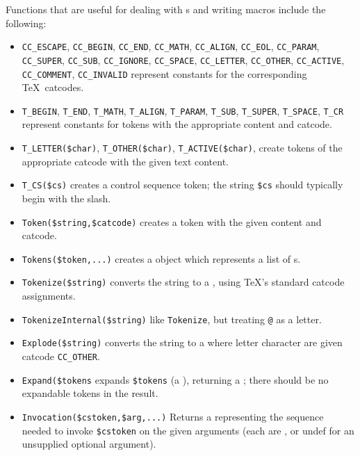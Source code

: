 \documentclass{book}
\begin{document}
Functions that are useful for dealing with s and writing macros
include the following:
\begin{itemize}
\item \raggedright \verb|CC_ESCAPE|, \verb|CC_BEGIN|, \verb|CC_END|, \verb|CC_MATH|,
      \verb|CC_ALIGN|, \verb|CC_EOL|, \verb|CC_PARAM|, \verb|CC_SUPER|,
      \verb|CC_SUB|,   \verb|CC_IGNORE|, \verb|CC_SPACE|, \verb|CC_LETTER|,
      \verb|CC_OTHER|, \verb|CC_ACTIVE|, \verb|CC_COMMENT|, \verb|CC_INVALID|
    represent constants for the corresponding \TeX\ catcodes.
\item  \raggedright \verb|T_BEGIN|, \verb|T_END|, \verb|T_MATH|, \verb|T_ALIGN|,
      \verb|T_PARAM|, \verb|T_SUB|, \verb|T_SUPER|, \verb|T_SPACE|,
      \verb|T_CR|
  represent constants for tokens with the appropriate content and catcode.
\item \verb|T_LETTER($char)|, \verb|T_OTHER($char)|, \verb|T_ACTIVE($char)|,
  create tokens of the appropriate catcode with the given text content.
\item \verb|T_CS($cs)| creates a control sequence token; 
  the string \verb|$cs| should typically begin with the slash.
\item \verb|Token($string,$catcode)| creates a token with the given content and catcode.
\item \verb|Tokens($token,...)| creates a  object which
   represents a list of s.
\item \verb|Tokenize($string)| converts the string to a ,
   using \TeX's standard catcode assignments.
\item \verb|TokenizeInternal($string)| like \texttt{Tokenize}, but
   treating \verb|@| as a letter.
\item \verb|Explode($string)| converts the string to a  where
   letter character are given catcode \verb|CC_OTHER|.
\item \verb|Expand($tokens| expands \verb|$tokens| (a ), returning
  a ; there should be no expandable tokens in the result.
\item \verb|Invocation($cstoken,$arg,...)| Returns a  representing
  the sequence needed to invoke \verb|$cstoken| on the given arguments (each are
  , or undef for an unsupplied optional argument).
\end{itemize}

\end{document}

